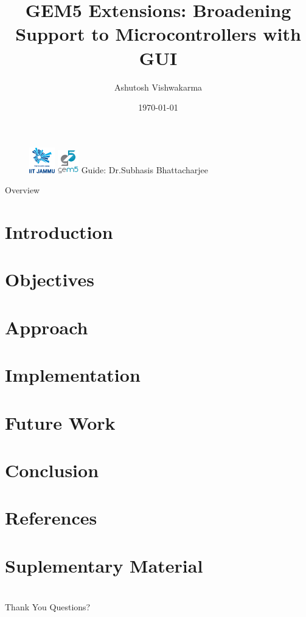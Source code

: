 \documentclass[10pt, aspectratio=169]{beamer}
\title[GEM5 Extensions]{\textbf{GEM5 Extensions}: Broadening Support to Microcontrollers with GUI}
\author{Ashutosh Vishwakarma}
\institute{IIT Jammu}
\date{\today}
\begin{document}
\begin{frame}
  \begin{figure}
    \centering
    \includegraphics[width=0.10\textwidth]{images/iitjammu.png}
    \hspace{1.5cm}
    \includegraphics[width=0.08\textwidth]{images/gem5.png}
    \titlepage
    \centering
    Guide: Dr.Subhasis Bhattacharjee
  \end{figure}
\end{frame}


\begin{frame}{Overview}
  \tableofcontents
\end{frame}

\section{Introduction}


\section{Objectives}


\section{Approach}


\section{Implementation}


\section{Future Work}


\section{Conclusion}
  

\section{References}


\section{Suplementary Material}


\section{}
\begin{frame}{Thank You}
  \centering
  Questions?
\end{frame}
\end{document}
